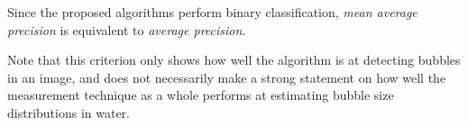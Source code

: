 		Since the proposed algorithms perform binary classification, \textit{mean average precision} is equivalent to \textit{average precision}. 
		
		Note that this criterion only shows how well the algorithm is at detecting bubbles in an image, and does not necessarily make a strong statement on how well the measurement technique as a whole performs at estimating bubble size distributions in water. 
		
		 



































